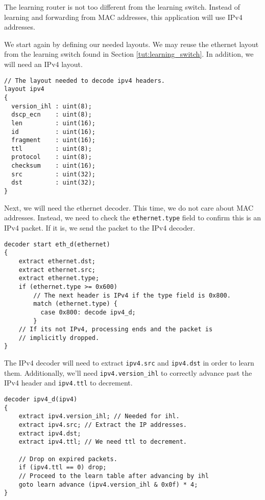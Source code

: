 The learning router is not too different from the learning switch. Instead of learning and forwarding from MAC addresses, this application will use IPv4 addresses.

We start again by defining our needed layouts. We may reuse the ethernet layout from the learning switch found in Section \ref{tut:learning_switch}. In addition, we will need an IPv4 layout.

\begin{codepage}
\begin{lstlisting}
// The layout needed to decode ipv4 headers.
layout ipv4
{
  version_ihl : uint(8);
  dscp_ecn    : uint(8);
  len         : uint(16);
  id          : uint(16);
  fragment    : uint(16);
  ttl         : uint(8);
  protocol    : uint(8);
  checksum    : uint(16);
  src         : uint(32);
  dst         : uint(32);
}
\end{lstlisting}
\end{codepage}

Next, we will need the ethernet decoder. This time, we do not care about MAC addresses. Instead, we need to check the \texttt{ethernet.type} field to confirm this is an IPv4 packet. If it is, we send the packet to the IPv4 decoder.

\begin{codepage}
\begin{lstlisting}
decoder start eth_d(ethernet)
{
	extract ethernet.dst;
	extract ethernet.src;
	extract ethernet.type;
	if (ethernet.type >= 0x600)
	  	// The next header is IPv4 if the type field is 0x800.
	    match (ethernet.type) {
	      case 0x800: decode ipv4_d;
	    }
	// If its not IPv4, processing ends and the packet is
	// implicitly dropped.
}
\end{lstlisting}
\end{codepage}

The IPv4 decoder will need to extract \texttt{ipv4.src} and \texttt{ipv4.dst} in order to learn them. Additionally, we'll need \texttt{ipv4.version\_ihl} to correctly advance past the IPv4 header and \texttt{ipv4.ttl} to decrement.

\begin{codepage}
\begin{lstlisting}
decoder ipv4_d(ipv4)
{
	extract ipv4.version_ihl; // Needed for ihl.
	extract ipv4.src; // Extract the IP addresses.
	extract ipv4.dst;
	extract ipv4.ttl; // We need ttl to decrement.

	// Drop on expired packets.
	if (ipv4.ttl == 0) drop;
	// Proceed to the learn table after advancing by ihl
	goto learn advance (ipv4.version_ihl & 0x0f) * 4;
}
\end{lstlisting}
\end{codepage}

